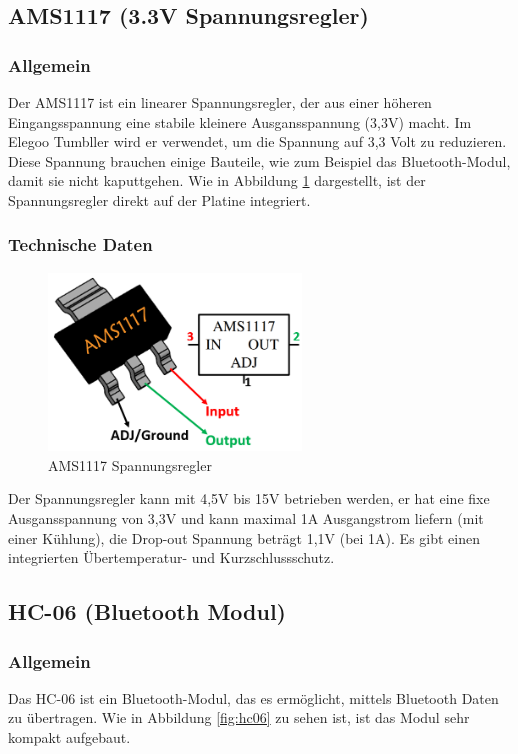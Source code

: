 \subsection{AMS1117 (3.3V Spannungsregler)}
%
\subsubsection{Allgemein}
Der AMS1117 ist ein linearer Spannungsregler,
der aus einer höheren Eingangsspannung eine stabile kleinere Ausgansspannung (3,3V) macht.
%
Im Elegoo Tumbller wird er verwendet,
um die Spannung auf 3,3 Volt zu reduzieren.
%
Diese Spannung brauchen einige Bauteile,
wie zum Beispiel das Bluetooth-Modul,
damit sie nicht kaputtgehen.
%
Wie in Abbildung \ref{fig:ams1117} dargestellt,
ist der Spannungsregler direkt auf der Platine integriert.
\subsubsection{Technische Daten}
\begin{figure}[H]
    \centering
    \includegraphics[width=0.6\textwidth]{img/Hardware/AMS1117.png}
    \caption{AMS1117 Spannungsregler}
    \label{fig:ams1117}
\end{figure}
Der Spannungsregler kann mit 4,5V bis 15V betrieben werden,
er hat eine fixe Ausgansspannung von 3,3V und kann maximal 1A Ausgangstrom liefern (mit einer Kühlung),
die Drop-out Spannung beträgt 1,1V (bei 1A).
%
Es gibt einen integrierten Übertemperatur- und Kurzschlussschutz.
%
\subsection{HC-06 (Bluetooth Modul)}
%
\subsubsection{Allgemein}
Das HC-06 ist ein Bluetooth-Modul,
das es ermöglicht,
mittels Bluetooth Daten zu übertragen.
%
Wie in Abbildung \ref{fig:hc06} zu sehen ist,
ist das Modul sehr kompakt aufgebaut.
